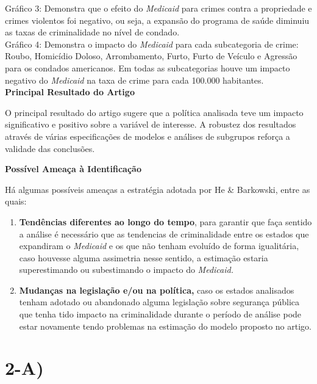 \documentclass[12pt]{article}
\begin{document}
Gráfico 3: Demonstra que o efeito do \emph{Medicaid} para crimes contra
a propriedade e crimes violentos foi negativo, ou seja, a expansão do
programa de saúde diminuiu as taxas de criminalidade no nível de
condado.\\


Gráfico 4: Demonstra o impacto do \emph{Medicaid} para cada subcategoria
de crime: Roubo, Homicídio Doloso, Arrombamento, Furto, Furto de Veículo
e Agressão para os condados americanos. Em todas as subcategorias houve
um impacto negativo do \emph{Medicaid} na taxa de crime para cada
100.000 habitantes.\\



\vspace*{1cm}
\textbf{Principal Resultado do Artigo}

O principal resultado do artigo sugere que a política analisada teve um
impacto significativo e positivo sobre a variável de interesse. A
robustez dos resultados através de várias especificações de modelos e
análises de subgrupos reforça a validade das conclusões.


\vspace*{1cm}
\textbf{Possível Ameaça à Identificação}

Há algumas possíveis ameaças a estratégia adotada por He \& Barkowski,
entre as quais:
\begin{enumerate}
    \item \textbf{Tendências diferentes ao longo do tempo}, para garantir que faça
sentido a análise é necessário que as tendencias de criminalidade entre
os estados que expandiram o \emph{Medicaid} e os que não tenham evoluído
de forma igualitária, caso houvesse alguma assimetria nesse sentido, a
estimação estaria superestimando ou subestimando o impacto do
\emph{Medicaid.}
    
    \item \textbf{Mudanças na legislação e/ou na política,} caso os estados
analisados tenham adotado ou abandonado alguma legislação sobre
segurança pública que tenha tido impacto na criminalidade durante o
período de análise pode estar novamente tendo problemas na estimação do
modelo proposto no artigo.

\end{enumerate}
\vspace*{1cm}
\section*{2-A)}
\end{document}
